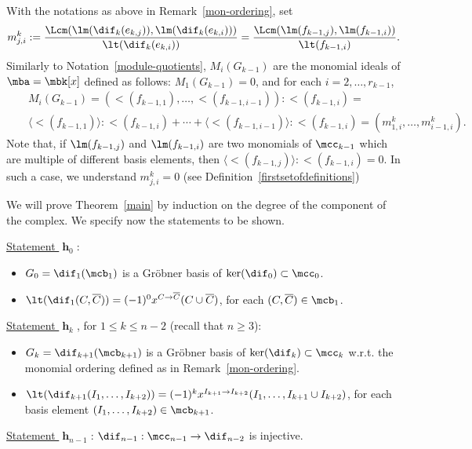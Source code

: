 \begin{notation}\label{m-basis-elements}
With the notations as above in Remark~\ref{mon-ordering}, set
\begin{eqnarray*}
m^k_{j,i}:=\frac{\Lcm(\lm(\dif_{k}(e_{k,j})),\lm(\dif_k(e_{k,i})))}
{\lt(\dif_k(e_{k,i}))}=
\frac{\Lcm(\lm(f_{k-1,j}),\lm(f_{k-1,i}))}{\lt(f_{k-1,i})}.
\end{eqnarray*}
Similarly to Notation~\ref{module-quotients}, $M_i(G_{k-1})$ are the
monomial ideals of $\mba=\mbk[x]$ defined as follows:
$M_1(G_{k-1})=0$, and for each $i=2,\ldots,r_{k-1}$,
\begin{eqnarray*}
&& M_i(G_{k-1})=(\lt(f_{k-1,1}),\ldots,\lt(f_{k-1,i-1})):\lt(f_{k-1,i})=
  \\ && \langle\lt(f_{k-1,1})\rangle:\lt(f_{k-1,i})+\cdots+
  \langle\lt(f_{k-1,i-1})\rangle:\lt(f_{k-1,i})= (m^k_{1,i},\ldots
  ,m^k_{i-1,i}).
\end{eqnarray*}
Note that, if $\lm(f_{k-1,j})$ and $\lm(f_{k-1,i})$ are two monomials
of $\mcc_{k-1}$ which are multiple of different basis elements, then
$\langle\lt(f_{k-1,j})\rangle:\lt(f_{k-1,i})=0$. In such a case, we
understand $m_{j,i}^k=0$ (see Definition~\ref{firstsetofdefinitions})
\end{notation}
 
\begin{notation}\label{hyphk} 
We will prove Theorem~\ref{main} by induction on the degree of the
component of the complex. We specify now the statements to be shown.

\underline{Statement $\mbfh_0$}:
\begin{itemize}
\item[$(a)$] $G_{0}=\dif_{1}(\mcb_{1})$ is a Gr\"obner basis of
  $\ker(\dif_{0})\subset\mcc_{0}$.
\item[$(b)$] $\lt(\dif_{1}(C,\overline{C}))=
  (-1)^0x^{C\to\overline{C}}(C\cup\overline{C})$, for each
  $(C,\overline{C})\in\mcb_{1}$.
\end{itemize}

\underline{Statement $\mbfh_k$}, for $1\leq k\leq n-2$ (recall that
$n\geq 3$):
\begin{itemize}
\item[$(a)$] $G_{k}=\dif_{k+1}(\mcb_{k+1})$ is a Gr\"obner basis of
  $\ker(\dif_{k})\subset\mcc_{k}$ w.r.t. the monomial ordering defined
  as in Remark~\ref{mon-ordering}.
\item[$(b)$] $\lt(\dif_{k+1}(I_1,\ldots
  ,I_{k+2}))=(-1)^{k}x^{I_{k+1}\to I_{k+2}}(I_1,\ldots ,I_{k+1}\cup
  I_{k+2})$, for each basis element $(I_1,\ldots
  ,I_{k+2})\in\mcb_{k+1}$.
\end{itemize}

\underline{Statement $\mbfh_{n-1}$}:
$\dif_{n-1}:\mcc_{n-1}\to\dif_{n-2}$ is injective.
\end{notation}

